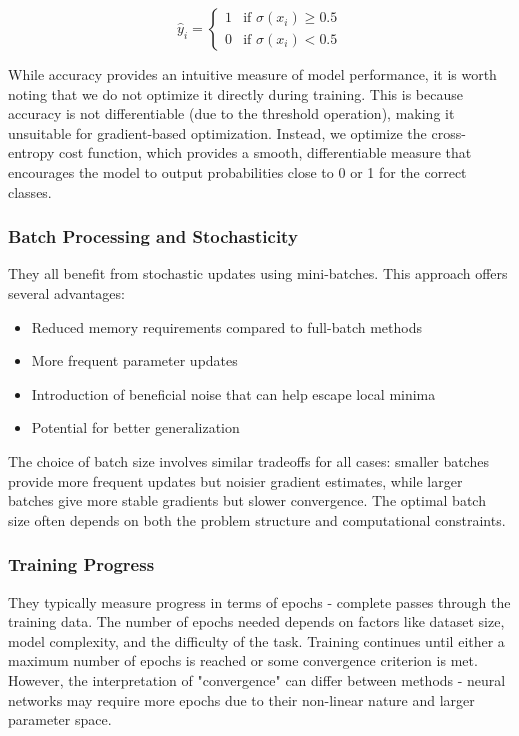 \documentclass[aps,pra,english,notitlepage,reprint,nofootinbib]{revtex4-1}  %
\begin{document}
\begin{equation}
    \hat{y}_i =
    \begin{cases}
        1 & \text{if } \sigma(x_i) \geq 0.5 \\
        0 & \text{if } \sigma(x_i) < 0.5
    \end{cases}
\end{equation}

While accuracy provides an intuitive measure of model performance, it is worth noting that we do not optimize it directly during training. This is because accuracy is not differentiable (due to the threshold operation), making it unsuitable for gradient-based optimization. Instead, we optimize the cross-entropy cost function, which provides a smooth, differentiable measure that encourages the model to output probabilities close to 0 or 1 for the correct classes.

\subsubsection{Batch Processing and Stochasticity}
They all benefit from stochastic updates using mini-batches. This approach offers several advantages:

\begin{itemize}
    \item Reduced memory requirements compared to full-batch methods
    \item More frequent parameter updates
    \item Introduction of beneficial noise that can help escape local minima
    \item Potential for better generalization
\end{itemize}

The choice of batch size involves similar tradeoffs for all cases: smaller batches provide more frequent updates but noisier gradient estimates, while larger batches give more stable gradients but slower convergence. The optimal batch size often depends on both the problem structure and computational constraints.

\subsubsection{Training Progress}
They typically measure progress in terms of epochs - complete passes through the training data. The number of epochs needed depends on factors like dataset size, model complexity, and the difficulty of the task. Training continues until either a maximum number of epochs is reached or some convergence criterion is met. However, the interpretation of "convergence" can differ between methods - neural networks may require more epochs due to their non-linear nature and larger parameter space.
\end{document}
